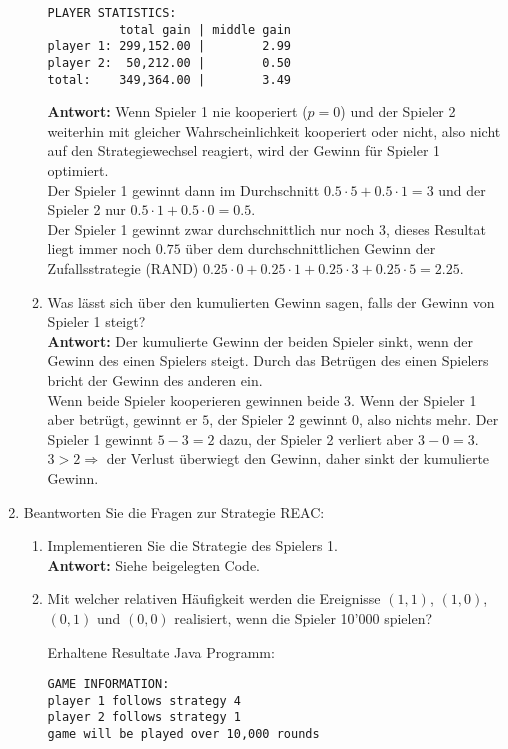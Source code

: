 \documentclass[12pt,a4paper]{article}
\begin{document}
\begin{enumerate}
\begin{enumerate}
\begin{verbatim}
PLAYER STATISTICS:
          total gain | middle gain
player 1: 299,152.00 |        2.99
player 2:  50,212.00 |        0.50
total:    349,364.00 |        3.49
\end{verbatim}
\textbf{Antwort:} Wenn Spieler 1 nie kooperiert ($p=0$) und der Spieler 2 weiterhin mit gleicher Wahrscheinlichkeit kooperiert oder nicht,
also nicht auf den Strategiewechsel reagiert, wird der Gewinn für Spieler 1 optimiert.\\
Der Spieler 1 gewinnt dann im Durchschnitt $0.5 \cdot 5 + 0.5 \cdot 1 = 3$ und der Spieler 2 nur $0.5 \cdot 1 + 0.5 \cdot 0 = 0.5$.\\
Der Spieler 1 gewinnt zwar durchschnittlich nur noch $3$, dieses Resultat liegt immer noch $0.75$ über dem durchschnittlichen Gewinn der Zufallsstrategie (RAND) $0.25 \cdot 0 + 0.25 \cdot 1 + 0.25 \cdot 3 + 0.25 \cdot 5 = 2.25$.
\newpage

\item Was lässt sich über den kumulierten Gewinn sagen, falls der Gewinn von Spieler 1 steigt?\\
\textbf{Antwort:} Der kumulierte Gewinn der beiden Spieler sinkt, wenn der Gewinn des einen Spielers steigt.
Durch das Betrügen des einen Spielers bricht der Gewinn des anderen ein.\\
Wenn beide Spieler kooperieren gewinnen beide $3$. Wenn der Spieler 1 aber betrügt, gewinnt er $5$, der Spieler 2 gewinnt $0$, also nichts mehr.
Der Spieler 1 gewinnt $5 - 3 = 2$ dazu, der Spieler 2 verliert aber $3 - 0 = 3$.\\
$3 > 2 \Rightarrow$ der Verlust überwiegt den Gewinn, daher sinkt der kumulierte Gewinn.
\end{enumerate}

\item Beantworten Sie die Fragen zur Strategie REAC: 
\begin{enumerate}
\item Implementieren Sie die Strategie des Spielers 1.\\
\textbf{Antwort:} Siehe beigelegten Code.

\item Mit welcher relativen Häufigkeit werden die Ereignisse $(1, 1)$, $(1, 0)$, $(0, 1)$ und $(0, 0)$ realisiert, wenn die Spieler 10'000 spielen?\\
\begin{center}Erhaltene Resultate Java Programm:\end{center}
\begin{verbatim}
GAME INFORMATION:
player 1 follows strategy 4
player 2 follows strategy 1
game will be played over 10,000 rounds


\end{verbatim}
\end{enumerate}
\end{enumerate}
\end{document}
